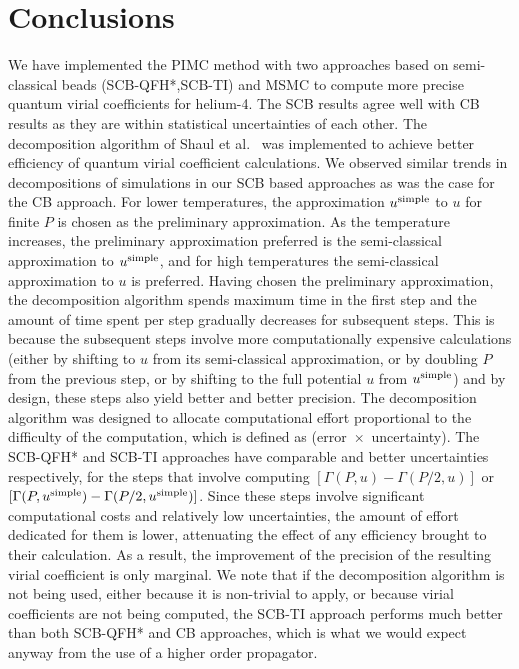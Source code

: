     \section{Conclusions}
    \label{sec:heConclusion}
        We have implemented the PIMC method with two approaches based on semi-classical beads (SCB-QFH*,SCB-TI) and MSMC to compute more precise quantum virial coefficients for helium-4. The SCB results agree well with CB results as they are within statistical uncertainties of each other. The decomposition algorithm of Shaul et al.~\cite{Shaul2012} was implemented to achieve better efficiency of quantum virial coefficient calculations. We observed similar trends in decompositions of simulations in our SCB based approaches as was the case for the CB approach. For lower temperatures, the approximation $u^{\rm simple}$ to $u$ for finite $P$ is chosen as the preliminary approximation. As the temperature increases, the preliminary approximation preferred is the semi-classical approximation to $u^{\rm simple}$, and for high temperatures the semi-classical approximation to $u$ is preferred. Having chosen the preliminary approximation, the decomposition algorithm spends maximum time in the first step and the amount of time spent per step gradually decreases for subsequent steps. This is because the subsequent steps involve more computationally expensive calculations (either by shifting to $u$ from its semi-classical approximation, or by doubling $P$ from the previous step, or by shifting to the full potential $u$ from $u^{\rm simple}$) and by design, these steps also yield better and better precision. The decomposition algorithm was designed to allocate computational effort proportional to the difficulty of the computation, which is defined as (error~$\times$~uncertainty). The SCB-QFH* and SCB-TI approaches have comparable and better uncertainties respectively, for the steps that involve computing $[\Gamma(P,u) - \Gamma(P/2,u)]$ or $[\Gamma(P,u^{\rm simple}) - \Gamma(P/2,u^{\rm simple})]$. Since these steps involve significant computational costs and relatively low uncertainties, the amount of effort dedicated for them is lower, attenuating the effect of any efficiency brought to their calculation. As a result, the improvement of the precision of the resulting virial coefficient is only marginal. We note that if the decomposition algorithm is not being used, either because it is non-trivial to apply, or because virial coefficients are not being computed, the SCB-TI approach performs much better than both SCB-QFH* and CB approaches, which is what we would expect anyway from the use of a higher order propagator.

